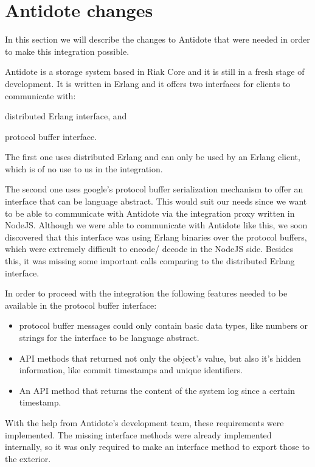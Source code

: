 \section{Antidote changes}
\label{sec:antidote_changes}
In this section we will describe the changes to Antidote that were needed in order to make this integration possible.\par
	Antidote is a storage system based in Riak Core and it is still in a fresh stage of development. It is written in Erlang and it offers two interfaces for clients to communicate with: 
\begin{enumerate*}[(i)]
\item distributed Erlang interface, and 
\item protocol buffer interface.
\end{enumerate*}
\par
	The first one uses distributed Erlang and can only be used by an Erlang client, which is of no use to us in the integration.\par
	The second one uses google's protocol buffer serialization mechanism to offer an interface that can be language abstract. This would suit our needs since we want to be able to communicate with Antidote via the integration proxy written in NodeJS. Although we were able to communicate with Antidote like this, we soon discovered that this interface was using Erlang binaries over the protocol buffers, which were extremely difficult to encode/ decode in the NodeJS side. Besides this, it was missing some important calls comparing to the distributed Erlang interface.\par
	In order to proceed with the integration the following features needed to be available in the protocol buffer interface:
	\begin{itemize}
	\item protocol buffer messages could only contain basic data types, like numbers or strings for the interface to be language abstract.
	\item API methods that returned not only the object's value, but also it's hidden information, like commit timestamps and unique identifiers.
	\item An API method that returns the content of the system log since a certain timestamp. 
	\end{itemize}
\par
	With the help from Antidote's development team, these requirements were implemented. The missing interface methods were already implemented internally, so it was only required to make an interface method to export those to the exterior.\par
